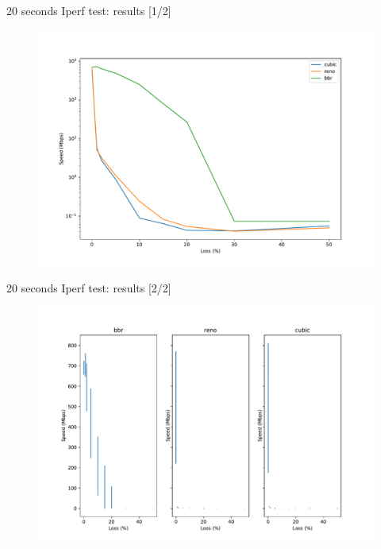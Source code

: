 \documentclass[13pt,aspectratio=43]{beamer}
\begin{document}
\begin{frame}{20 seconds Iperf test: results [1/2]}
  \begin{figure}
	  \includegraphics[width=\textwidth,height=\textheight,keepaspectratio]{../iperf_test/plot_log.pdf}
  \end{figure}
\end{frame}

\begin{frame}{20 seconds Iperf test: results [2/2]}
  \begin{figure}
	  \includegraphics[width=\textwidth,height=\textheight,keepaspectratio]{../iperf_test/violinplot.pdf}
  \end{figure}
\end{frame}
\end{document}
